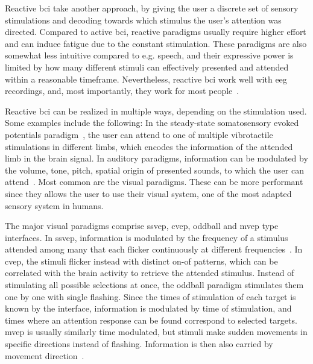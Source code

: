 Reactive \ac{bci} take another approach, by giving the user a discrete set of
sensory stimulations and decoding towards which stimulus the user's attention
was directed.
Compared to active \ac{bci}, reactive paradigms usually require higher effort
and can induce fatigue due to the constant stimulation.
These paradigms are also somewhat less intuitive compared to e.g. speech, and
their expressive power is limited by how many different stimuli can effectively
presented and attended within a reasonable timeframe.
Nevertheless, reactive \ac{bci} work well with \ac{eeg} recordings, and, most
importantly, they work for most people~\cite{Allison2010a,Edlinger2014}.

Reactive \ac{bci} can be realized in multiple ways, depending on the
stimulation used.
Some examples include the following:
In the steady-state somatosensory evoked potentials paradigm~\cite{Petit2021},
the user can attend to one of multiple vibrotactile stimulations in different
limbs, which encodes the information of the attended limb in the brain signal.
In auditory paradigms, information can be modulated by the volume, tone, pitch,
spatial origin of presented sounds, to which the user can
attend~\cite{Kaongoen2017}.
Most common are the visual paradigms.
These can be more performant since they allows the user to use their visual
system, one of the most adapted sensory system in humans.

The major visual paradigms comprise
\ac{ssvep}, \ac{cvep}, oddball and \ac{mvep} type interfaces.
In \ac{ssvep}, information is modulated by the frequency of a stimulus attended
among many that each flicker continuously at different
frequencies~\cite{Chen2021}.
In \ac{cvep}, the stimuli flicker instead with distinct on-of patterns, which can
be correlated with the brain activity to retrieve the attended stimulus.
Instead of stimulating all possible selections at once, the oddball paradigm
stimulates them one by one with single flashing.
Since the times of stimulation of each target is known by the interface,
information is modulated by time of stimulation, and times where an attention
response can be found correspond to selected targets.
\Ac{mvep} is usually similarly time modulated, but stimuli make sudden
movements in specific directions instead of flashing.
Information is then also carried by movement
direction~\cite{Libert2021a,Libert2022}.


